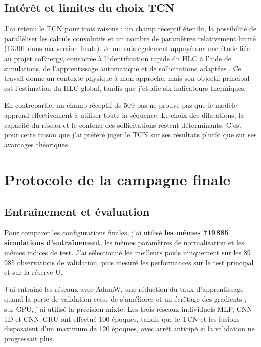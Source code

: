 \documentclass[10pt,a4paper]{article}
\begin{document}
\subsection{Intérêt et limites du choix TCN}
J'ai retenu le TCN pour trois raisons : un champ réceptif étendu, la possibilité de paralléliser les calculs convolutifs et un nombre de paramètres relativement limité (13\,301 dans ma version finale). Je me suis également appuyé sur une étude liée au projet coEnergy, consacrée à l'identification rapide du HLC à l'aide de simulations, de l'apprentissage automatique et de sollicitations adaptées \cite{coenergy2026}. Ce travail donne un contexte physique à mon approche, mais son objectif principal est l'estimation du HLC global, tandis que j'étudie six indicateurs thermiques.

En contrepartie, un champ réceptif de 509 pas ne prouve pas que le modèle apprend effectivement à utiliser toute la séquence. Le choix des dilatations, la capacité du réseau et le contenu des sollicitations restent déterminants. C'est pour cette raison que j'ai préféré juger le TCN sur ses résultats plutôt que sur ses avantages théoriques.

\section{Protocole de la campagne finale}

\subsection{Entraînement et évaluation}
Pour comparer les configurations finales, j'ai utilisé \textbf{les mêmes 719\,885 simulations d'entraînement}, les mêmes paramètres de normalisation et les mêmes indices de test. J'ai sélectionné les meilleurs poids uniquement sur les 89\,985 observations de validation, puis mesuré les performances sur le test principal et sur la réserve U.

J'ai entraîné les réseaux avec AdamW, une réduction du taux d'apprentissage quand la perte de validation cesse de s'améliorer et un écrêtage des gradients ; sur GPU, j'ai utilisé la précision mixte. Les trois réseaux individuels MLP, CNN 1D et CNN--GRU ont effectué 100 époques, tandis que le TCN et les fusions disposaient d'un maximum de 120 époques, avec arrêt anticipé si la validation ne progressait plus.
\end{document}
